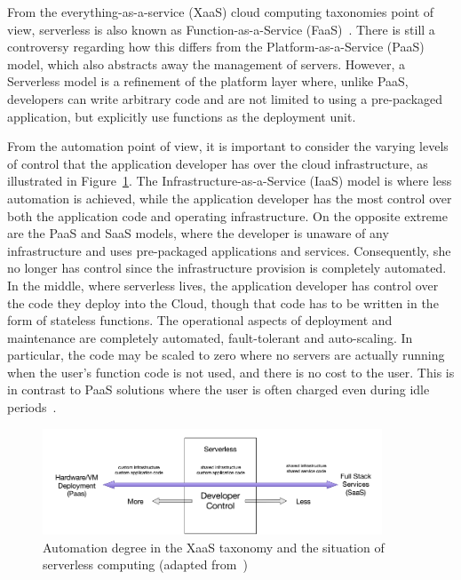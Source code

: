 From the everything-as-a-service (XaaS) cloud computing taxonomies point of view, serverless is also known as Function-as-a-Service (FaaS)~\cite{MateosFaaster17}. There is still a controversy regarding how this differs from the Platform-as-a-Service (PaaS) model, which also abstracts away the management of servers. However, a Serverless model is a refinement of the platform layer where, unlike PaaS, developers can write arbitrary code and are not limited to using a pre-packaged application, but explicitly use functions as the deployment unit. 


From the automation point of view, it is important to consider the varying levels of control that the application developer has over the cloud infrastructure, as illustrated in Figure~\ref{fig:developer-control-serverless}. The Infrastructure-as-a-Service (IaaS) model is where less automation is achieved, while the application developer has the most control over both the application code and operating infrastructure. On the opposite extreme are the PaaS and SaaS models, where the developer is unaware of any infrastructure and uses pre-packaged applications and services. Consequently, she no longer has control since the infrastructure provision is completely automated. In the middle, where serverless lives, the application developer has control over the code they deploy into the Cloud, though that code has to be written in the form of stateless functions.  The operational aspects of deployment and maintenance are completely automated, fault-tolerant and
auto-scaling. In particular, the code may be scaled to zero where no servers are actually running when the user's function code is not used, and there is no cost to the user. This is in contrast to PaaS solutions where the user is often charged even during idle periods~\cite{baldini2017serverless}.

\begin{figure}[tbp]
	\includegraphics[width=0.9\textwidth]{figs/DeveloperControl.png}
	\caption{Automation degree in the XaaS taxonomy and the situation of serverless computing (adapted from~\cite{baldini2017serverless})}
	\label{fig:developer-control-serverless}
\end{figure}


